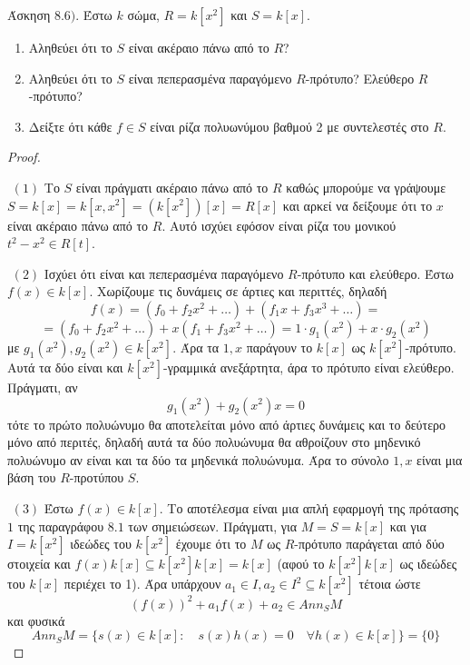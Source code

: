 \documentclass[oneside,a4paper]{article}
\begin{document}
\noindent Άσκηση $8.6)$. Έστω $k$ σώμα, $R=k[x^2]$ και $S = k[x]$.
\begin{enumerate}
	\item Αληθεύει ότι το $S$ είναι ακέραιο πάνω από το $R$?
	\item Αληθεύει ότι το $S$ είναι πεπερασμένα παραγόμενο $R$-πρότυπο? Ελεύθερο $R$-πρότυπο?
	\item Δείξτε ότι κάθε $f \in S$ είναι ρίζα πολυωνύμου βαθμού 2 με συντελεστές στο $R$.
\end{enumerate}
\vspace*{1cm}
\begin{proof} $ $

	$ $\newline
	$(1)$ Το $S$ είναι πράγματι ακέραιο πάνω από το $R$ καθώς μπορούμε να γράψουμε $S = k[x] = k[x,x^2] = (k[x^2])[x] = R[x]$ και αρκεί να δείξουμε ότι το $x$ είναι ακέραιο πάνω από το $R$. Αυτό ισχύει εφόσον είναι ρίζα του μονικού $t^2 - x^2 \in R[t]$.
	
	\vspace*{0.5cm}
	$ $\newline
	$(2)$ Ισχύει ότι είναι και πεπερασμένα παραγόμενο $R$-πρότυπο και ελεύθερο. Έστω $f(x) \in k[x]$. Χωρίζουμε τις δυνάμεις σε άρτιες και περιττές, δηλαδή $$f(x) = \left(f_0 + f_2 x^2 + \ldots \right) + \left(f_1 x + f_3 x^3 + \ldots \right) = $$
	$$ = \left(f_0 + f_2 x^2 + \ldots \right) + x(f_1 + f_3 x^2 + \ldots) = 1 \cdot g_1(x^2) + x \cdot g_2(x^2)$$ με $g_1(x^2), g_2(x^2) \in k[x^2]$. Άρα τα $1,x$ παράγουν το $k[x]$ ως $k[x^2]$-πρότυπο. Αυτά τα δύο είναι και $k[x^2]$-γραμμικά ανεξάρτητα, άρα το πρότυπο είναι ελεύθερο. Πράγματι, αν $$g_1(x^2) + g_2(x^2)x = 0$$ τότε το πρώτο πολυώνυμο θα αποτελείται μόνο από άρτιες δυνάμεις και το δεύτερο μόνο από περιτές, δηλαδή αυτά τα δύο πολυώνυμα θα αθροίζουν στο μηδενικό πολυώνυμο αν είναι και τα δύο τα μηδενικά πολυώνυμα. Άρα το σύνολο ${1,x}$ είναι μια βάση του $R$-προτύπου $S$.

	\vspace*{0.5cm}
	$ $\newline
	$(3)$ Έστω $f(x) \in k[x]$. Το αποτέλεσμα είναι μια απλή εφαρμογή της πρότασης $1$ της παραγράφου $8.1$ των σημειώσεων. Πράγματι, για $M = S =  k[x]$ και για $I = k[x^2]$ ιδεώδες του $k[x^2]$ έχουμε ότι το $M$ ως $R$-πρότυπο παράγεται από δύο στοιχεία και $f(x) k[x] \subseteq k[x^2]k[x] = k[x]$ (αφού το $k[x^2]k[x]$ ως ιδεώδες του $k[x]$ περιέχει το 1). Άρα υπάρχουν $a_1 \in I, a_2 \in I^2 \subseteq k[x^2]$ τέτοια ώστε $$\left(f(x)\right)^2 + a_1 f(x) + a_2 \in Ann_S M$$ και φυσικά $$Ann_S M = \{s(x) \in k[x]: \quad s(x)h(x) = 0 \quad \forall h(x) \in k[x]\} = \{0\}$$

\end{proof}
\pagebreak
\end{document}
